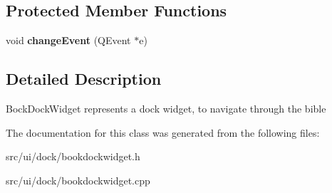 \subsection*{Protected Member Functions}
\begin{DoxyCompactItemize}
\item 
\hypertarget{classBookDockWidget_ae14ebc50c7a472d42172a48134b24337}{
void {\bfseries changeEvent} (QEvent $\ast$e)}
\label{classBookDockWidget_ae14ebc50c7a472d42172a48134b24337}

\end{DoxyCompactItemize}


\subsection{Detailed Description}
BockDockWidget represents a dock widget, to navigate through the bible 

The documentation for this class was generated from the following files:\begin{DoxyCompactItemize}
\item 
src/ui/dock/bookdockwidget.h\item 
src/ui/dock/bookdockwidget.cpp\end{DoxyCompactItemize}

